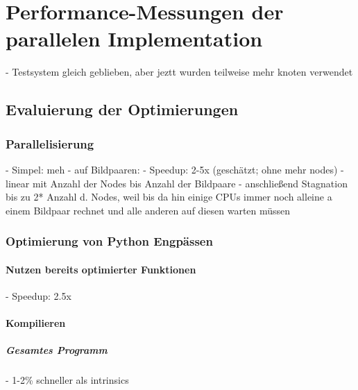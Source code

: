 \chapter{Performance-Messungen der parallelen Implementation}

\begin{correctme}
	- Testsystem gleich geblieben, aber jeztt wurden teilweise mehr knoten verwendet
\end{correctme}

\section{Evaluierung der Optimierungen}

\subsection{Parallelisierung}

\begin{correctmore}
	- Simpel: meh
	- auf Bildpaaren:
		- Speedup: 2-5x (geschätzt; ohne mehr nodes)
		- linear mit Anzahl der Nodes bis Anzahl der Bildpaare
		- anschließend Stagnation bis zu 2* Anzahl d. Nodes, weil bis da hin einige CPUs immer noch alleine a einem Bildpaar rechnet und alle anderen auf diesen warten müssen
\end{correctmore}

\subsection{Optimierung von Python Engpässen}

\subsubsection{Nutzen bereits optimierter Funktionen}

\begin{correctmore}
	- Speedup: 2.5x
\end{correctmore}

\subsubsection{Kompilieren}

\paragraph{Gesamtes Programm}

\begin{correctmore}
	- 1-2\% schneller als intrinsics
\end{correctmore}

